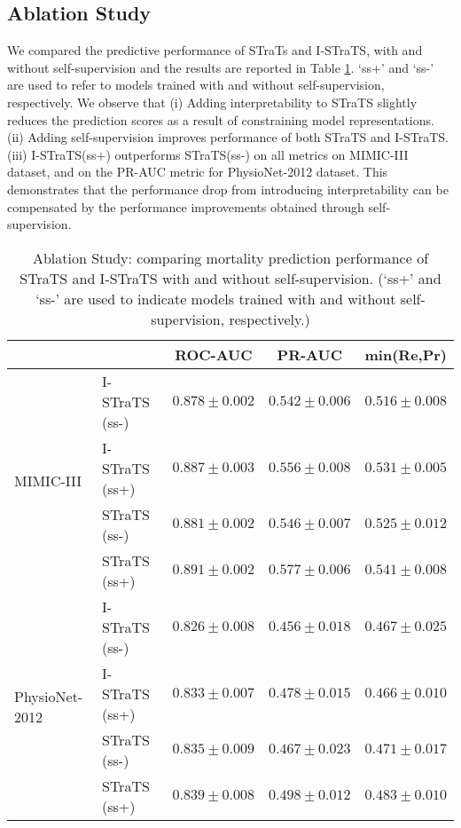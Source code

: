 \subsection{Ablation Study}
We compared the predictive performance of STraTs and I-STraTS, with and without self-supervision and the results are reported in Table \ref{tab:ablation}. `ss+' and `ss-' are used to refer to models trained with and without self-supervision, respectively. We observe that (i) Adding interpretability to STraTS slightly reduces the prediction scores as a result of constraining model representations. (ii) Adding self-supervision improves performance of both STraTS and I-STraTS. (iii) I-STraTS(ss+) outperforms STraTS(ss-) on all metrics on MIMIC-III dataset, and on the PR-AUC metric for PhysioNet-2012 dataset. This demonstrates that the performance drop from introducing interpretability can be compensated by the performance improvements obtained through self-supervision. 
\begin{table}[]
\centering
    \caption{Ablation Study: comparing mortality prediction performance of STraTS and I-STraTS with and without self-supervision. (`ss+' and `ss-' are used to indicate models trained with and without self-supervision, respectively.)}
    \label{tab:ablation}
    \begin{tabular}{llccc}
    \toprule
    & &ROC-AUC &PR-AUC &min(Re,Pr) \\
    \midrule
    \multirow{4}{*}{MIMIC-III}
    &I-STraTS (ss-) &$0.878\pm0.002$&$0.542\pm0.006$&$0.516\pm0.008$\\    
    &I-STraTS (ss+) &$0.887\pm0.003$&$0.556\pm0.008$&$0.531\pm0.005$\\
    &STraTS (ss-)      &$0.881\pm0.002$&$0.546\pm0.007$&$0.525\pm0.012$\\ 
    &STraTS (ss+) &$\mathbf{0.891\pm0.002}$&$\mathbf{0.577\pm0.006}$&$\mathbf{0.541\pm0.008}$\\
    \hline
    \multirow{4}{*}{PhysioNet-2012}
    &I-STraTS (ss-) &$0.826\pm0.008$&$0.456\pm0.018$&$0.467\pm0.025$\\
    &I-STraTS (ss+) &$0.833\pm0.007$&$0.478\pm0.015$&$0.466\pm0.010$\\
    &STraTS (ss-)  &$0.835\pm0.009$&$0.467\pm0.023$&$0.471\pm0.017$\\
    &STraTS (ss+)  &$\mathbf{0.839\pm0.008}$&$\mathbf{0.498\pm0.012}$&$\mathbf{0.483\pm0.010}$\\
    \bottomrule
    \end{tabular}
\end{table}

